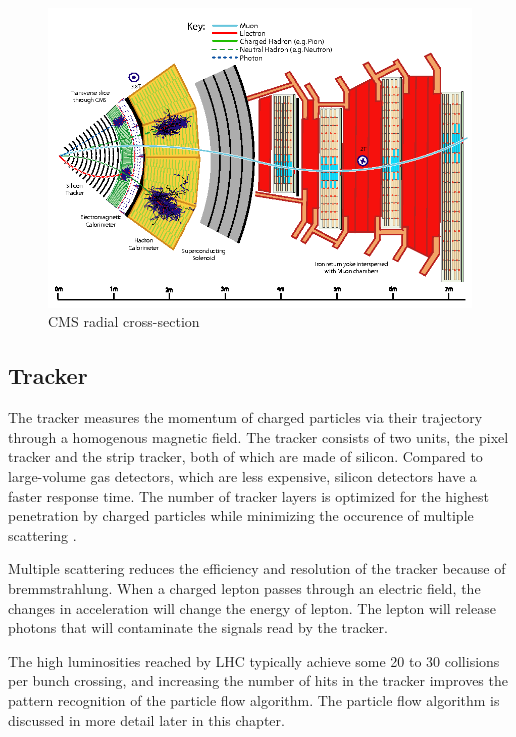 \begin{figure}[]
\begin{centering}
\includegraphics[width=5.5in]{Chapter3/importfigs/Figure_001.png}
\par\end{centering}
\caption{CMS radial cross-section \cite{10.1088/978-1-6817-4078-2ch4} \label{fig:cmsCutOutZY}}
\end{figure}

\subsection{Tracker}

The tracker measures the momentum of charged particles via their trajectory through a homogenous magnetic field. The tracker consists of two units, the pixel tracker and the strip tracker, both of which are made of silicon. Compared to large-volume gas detectors, which are less expensive, silicon detectors have a faster response time. The number of tracker layers is optimized for the highest penetration by charged particles while minimizing the occurence of multiple scattering \cite{cmsTdrTrk}. 

Multiple scattering reduces the efficiency and resolution of the tracker because of bremmstrahlung. When a charged lepton passes through an electric field, the changes in acceleration will change the energy of lepton. The lepton will release photons that will contaminate the signals read by the tracker. 

The high luminosities reached by LHC typically achieve some 20 to 30 collisions per bunch crossing, and increasing the number of hits in the tracker improves the pattern recognition of the particle flow algorithm. The particle flow algorithm is discussed in more detail later in this chapter. 


